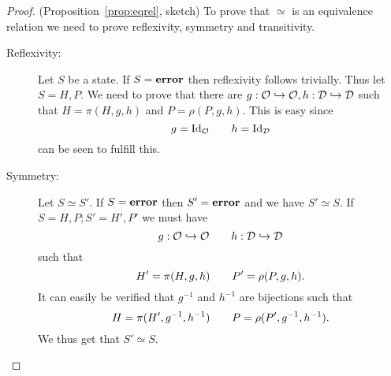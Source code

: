 \begin{proof}{(Proposition~\ref{prop:eqrel}, sketch)} 
  To prove that $\simeq$ is an equivalence relation we need to prove
  reflexivity, symmetry and transitivity.
  \begin{description}
    \item[Reflexivity:] Let $S$ be a state. If $S = \mbox{{\bf error}}$ then reflexivity
      follows trivially. Thus let $S = H, P$. We need to prove that there are $g: 
      \mathcal{O} \hookrightarrow \mathcal{O}, h: \mathcal{D} \hookrightarrow \mathcal{D}$
      such that $H = \pi(H, g, h)$ and $P = \rho(P, g, h)$. This is easy since
      \begin{equation*}
        g = \mathrm{Id}_{\mathcal{O}} \quad\quad h = \mathrm{Id}_{\mathcal{D}}
      \end{equation*}
      can be seen to fulfill this.

    \item[Symmetry:] Let $S \simeq S'$. If $S = \mbox{{\bf error}}$ then $S' = \mbox{{\bf error}}$ and
      we have $S' \simeq S$. If $S = H, P; S' = H', P'$ we must have
      \begin{equation*}
        g: \mathcal{O} \hookrightarrow \mathcal{O} \quad\quad h: \mathcal{D}
        \hookrightarrow \mathcal{D}
      \end{equation*}
      such that
      \begin{equation*}
        H' = \pi(H, g, h) \quad\quad P' = \rho(P, g, h).
      \end{equation*}
      It can easily be verified that $g^{-1}$ and $h^{-1}$ are bijections such that
      \begin{equation*}
        H = \pi(H', g^{-1}, h^{-1}) \quad\quad P = \rho(P', g^{-1}, h^{-1}).
      \end{equation*}
      We thus get that $S' \simeq S$.


\end{description}
\end{proof}
